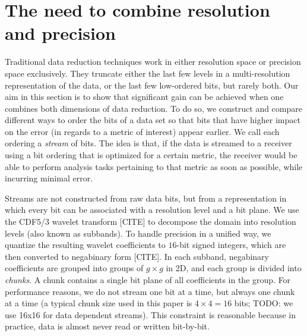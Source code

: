 

\section{The need to combine resolution and precision}

Traditional data reduction techniques work in either resolution space or precision space
exclusively. They truncate either the last few levels in a multi-resolution representation of the
data, or the last few low-ordered bits, but rarely both. Our aim in this section is to show that
significant gain can be achieved when one combines both dimensions of data reduction. To do so, we
construct and compare different ways to order the bits of a data set so that bits that have higher
impact on the error (in regards to a metric of interest) appear earlier. We call each ordering a
\emph{stream} of bits. The idea is that, if the data is streamed to a receiver using a bit ordering
that is optimized for a certain metric, the receiver would be able to perform analysis tasks
pertaining to that metric as soon as possible, while incurring minimal error.

Streams are not constructed from raw data bits, but from a representation in which every bit can be
associated with a resolution level and a bit plane. We use the CDF5/3 wavelet transform [CITE] to
decompose the domain into resolution levels (also known as subbands). To handle precision in a
unified way, we quantize the resulting wavelet coefficients to $16$-bit signed integers, which are
then converted to negabinary form [CITE]. In each subband, negabinary coefficients are grouped into
groups of $g \times g$ in 2D, and each group is divided into \emph{chunks}. A chunk contains a
single bit plane of all coefficients in the group. For performance reasons, we do not stream one bit
at a time, but always one chunk at a time (a typical chunk size used in this paper is $4 \times 4 =
16$ bits; TODO: we use 16x16 for data dependent streams). This constraint is reasonable because in practice, data is almost never read or written
bit-by-bit.

